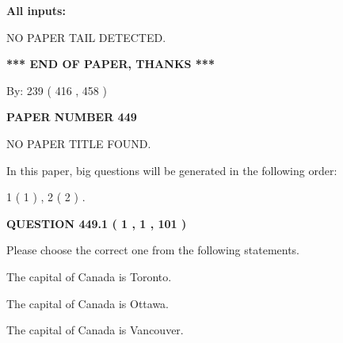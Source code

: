 \documentclass[12pt]{article}
\begin{document}
   
   
   
\noindent{}
   
   
   
   
\noindent\vspace{0.1in}\hspace{-0.08in} {\textbf{\Large{All inputs: }}}
   
   
   
   
\vspace{2.0in} NO PAPER TAIL DETECTED.
   
   
   
   
\vspace{1.0in} 
{\textbf{\large{ *** END OF PAPER, THANKS *** }}} 
   
   
\hspace{1.0in} By: 
 239 ( 416 ,  458 )
   
   
   
   
\newpage 
\setcounter{page}{ 
   449001 } 
   
   
   
   
 {\textbf{ \Large{ PAPER NUMBER  449  }}}
   
   
\vspace{0.2in}
   
   
   
   
   
   
 NO PAPER TITLE FOUND.
   
   
   
\vspace{0.2in}
   
In this paper, big questions will be generated in the following order: 
   
   
   1 ( 1 )
 ,
   2 ( 2 )
 .
  
\vspace{0.2in}
  
{\textbf{\Large{QUESTION
449.1 
 ( 1 , 1 , 101 )
}}}
  
  
Please choose the correct one from the following statements.
 
 
The capital of Canada is Toronto.
 
 
The capital of Canada is Ottawa.
 
 
The capital of Canada is Vancouver.
 
\end{document}
